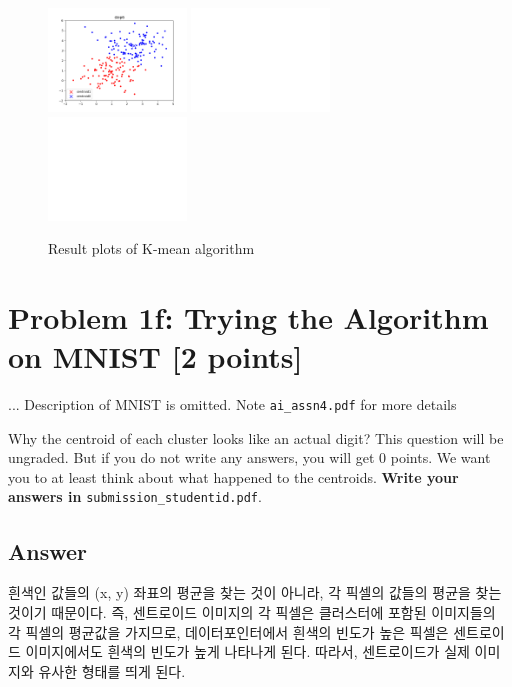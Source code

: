 \documentclass[a4paper]{article}
\begin{document}
\begin{figure}[h!]
    \includegraphics[width=0.327\textwidth]{../ai_assn4_prog/results/2D/step6.png}
    \includegraphics[width=0.327\textwidth]{../white.png}
    \includegraphics[width=0.327\textwidth]{../white.png}
    \caption{Result plots of K-mean algorithm}
    \label{fig:result}
\end{figure}

\section*{Problem 1f: Trying the Algorithm on MNIST [2 points]}
... Description of MNIST is omitted. Note \texttt{ai\_assn4.pdf} for more details

\medskip
\noindent
Why the centroid of each cluster looks like an actual digit? This question will be ungraded. But if you do not write any answers, you will get 0 points. We want you to at least think about what happened to the centroids. \textbf{Write your answers in} \texttt{submission\_studentid.pdf}.

\subsection*{Answer}

흰색인 값들의 (x, y) 좌표의 평균을 찾는 것이 아니라, 각 픽셀의 값들의 평균을 찾는 것이기 때문이다. 즉, 센트로이드 이미지의 각 픽셀은 클러스터에 포함된 이미지들의 각 픽셀의 평균값을 가지므로, 데이터포인터에서 흰색의 빈도가 높은 픽셀은 센트로이드 이미지에서도 흰색의 빈도가 높게 나타나게 된다. 따라서, 센트로이드가 실제 이미지와 유사한 형태를 띄게 된다.
\end{document}
